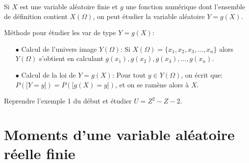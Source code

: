 \documentclass[a4paper, 11pt]{article}
\begin{document}
 Si $X$ est une variable al\'eatoire finie et $g$ une fonction num\'erique dont l'ensemble de d\'efinition contient $X(\Omega)$, on peut \'etudier la variable al\'eatoire $Y=g(X)$.\vsec\vsec 

\begin{dboxminipage}{0.9 \textwidth}
M\'ethode pour \'etudier les var de type $Y=g(X)$:
\begin{itemize}
\item[$\bullet$] Calcul de l'univers image $Y(\Omega)$:
 Si $X(\Omega)=\lbrace x_1,x_2,x_3,\dots,x_n\rbrace$ alors $Y(\Omega)$ s'obtient en calculant $g(x_1), g(x_2), g(x_3),\dots, g(x_n)$.
\item[$\bullet$] Calcul de la loi de $Y=g(X)$:
 Pour tout $y\in Y(\Omega)$, on \'ecrit que: $P(\lbrack Y=y\rbrack)=P(\lbrack g(X)=y\rbrack)$, et on se ram\`{e}ne alors \`{a} $X$.
\end{itemize}
\end{dboxminipage}

%
%

\begin{exercice} 
Reprendre l'exemple 1 du d\'ebut et \'etudier $U=Z^2-Z-2$.
\end{exercice}





\section{Moments d'une variable al\'eatoire r\'eelle finie}

\end{document}

